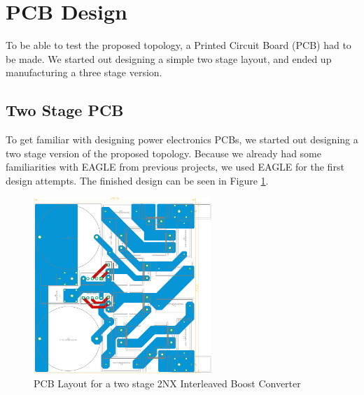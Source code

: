\section{PCB Design}\label{sec:PCB}

To be able to test the proposed topology,
a Printed Circuit Board (PCB) had to be made.
We started out designing a simple two stage layout,
and ended up manufacturing a three stage version.

\subsection{Two Stage PCB}
To get familiar with designing power electronics PCBs,
we started out designing a two stage version of the proposed topology.
Because we already had some familiarities with EAGLE from previous projects,
we used EAGLE for the first design attempts.
The finished design can be seen in Figure \ref{fig:2nxeagle}.

\begin{figure}[H]
	\begin{center}
	\includegraphics[width=0.6\textwidth]{figures/05cPCBdesign/2NX_interleaved_boost_converter_EAGLE_BY_DANIEL.pdf}
	\end{center}
	\caption{PCB Layout for a two stage 2NX Interleaved Boost Converter}
	\label{fig:2nxeagle}
\end{figure}

